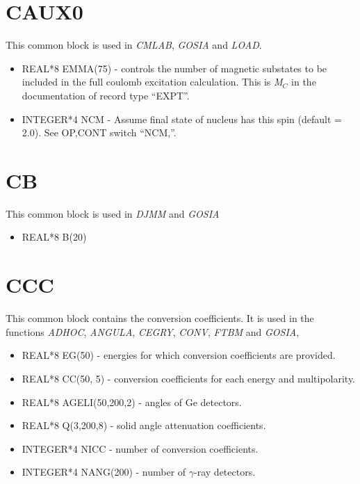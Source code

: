 \section{CAUX0}

This common block is used in {\em CMLAB}, {\em GOSIA} and {\em LOAD}.

\begin{itemize}
\item REAL*8 EMMA(75) - controls the number of magnetic substates to be
included in the full coulomb excitation calculation. This is {\em M$_C$} in
the documentation of record type ``EXPT''.
\item INTEGER*4 NCM - Assume final state of nucleus has this spin (default =
2.0). See OP,CONT switch ``NCM,''.
\end{itemize}

\section{CB}

This common block is used in {\em DJMM} and {\em GOSIA}

\begin{itemize}
\item REAL*8 B(20)
\end{itemize}

\section{CCC}

This common block contains the conversion coefficients. It is used in the
functions {\em ADHOC}, {\em ANGULA}, {\em CEGRY}, {\em CONV}, {\em FTBM}
and {\em GOSIA}, {\em }

\begin{itemize}
\item REAL*8 EG(50) - energies for which conversion coefficients are
provided.
\item REAL*8 CC(50, 5) - conversion coefficients for each energy and
multipolarity.
\item REAL*8 AGELI(50,200,2) - angles of Ge detectors.
\item REAL*8 Q(3,200,8) - solid angle attenuation coefficients.
\item INTEGER*4 NICC - number of conversion coefficients.
\item INTEGER*4 NANG(200) - number of $\gamma$-ray detectors.
\end{itemize}

